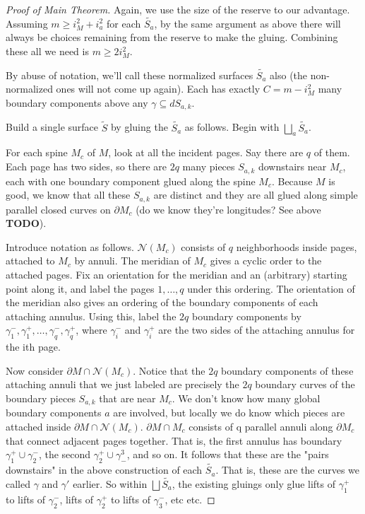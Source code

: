 \documentclass[12pt]{amsart}
\theoremstyle{definition}
\theoremstyle{remark}
\newcommand{\bd}{\partial}
\newcommand{\cin}{\subseteq}
\newcommand{\cN}{\mathcal{N}}
\begin{document}
\begin{proof}[Proof of Main Theorem]
Again, we use the size of the reserve to our advantage. Assuming $m\geq i_M^2
+ i_a^2$ for each $\widetilde{S_a}$, by the same argument as above there will
always be choices remaining from the reserve to make the gluing. Combining
these all we need is $m\geq 2i_M^2$.

By abuse of notation, we'll call these normalized surfaces $\widetilde{S_a}$ also (the
non-normalized ones will not come up again). Each has exactly $C = m - i_M^2$
many boundary components above any $\gamma \cin dS_{a,k}$.

Build a single surface $\widetilde{S}$ by gluing the $\widetilde{S_a}$ as follows. Begin with
$\bigsqcup_a \widetilde{S_a}$.

For each spine $M_c$ of $M$, look at all the incident pages. Say there are $q$
of them.  Each page has two sides, so there are $2q$ many pieces $S_{a,k}$
downstairs near $M_c$, each with one boundary component glued along the spine
$M_c$.  Because $M$ is good, we know that all these $S_{a,k}$ are distinct and
they are all glued along simple parallel closed curves on $\bd M_c$ (do we know
they're longitudes?  See above \textbf{ TODO}).

Introduce notation as follows. $\cN(M_c)$ consists of $q$ neighborhoods inside
pages, attached to $M_c$ by annuli. The meridian of $M_c$ gives a cyclic order to
the attached pages.  Fix an orientation for the meridian and an (arbitrary)
starting point along it, and label the pages $1, \dots, q$ under this ordering.
The orientation of the meridian also gives an ordering of the boundary
components of each attaching annulus.  Using this, label the $2q$ boundary
components by $\gamma_1^-,\gamma_1^+,\dots, \gamma_q^-,\gamma_q^+$, where
$\gamma_i^-$ and $\gamma_i^+$ are the two sides of the attaching annulus for
the ith page.

Now consider $\bd M \cap \cN(M_c)$. Notice that the $2q$ boundary components of these
attaching annuli that we just labeled are precisely the $2q$ boundary curves of
the boundary pieces $S_{a,k}$ that are near $M_c$. We don't know how many global
boundary components $a$ are involved, but locally we do know which pieces are
attached inside $\bd M \cap \cN(M_c)$. $\bd M \cap M_c$ consists of q parallel annuli
along $\bd M_c$ that connect adjacent pages together. That is, the first annulus
has boundary $\gamma_1^+ \cup \gamma_2^-$, the second $\gamma_2^+ \cup
\gamma^3_-$, and so on.  It follows that these are the "pairs downstairs" in
the above construction of each $\widetilde{S_a}$. That is, these are the curves
we called $\gamma$ and $\gamma'$ earlier.  So within $\bigsqcup \widetilde{S_a}$,
the existing gluings only glue lifts of $\gamma_1^+$ to lifts of $\gamma_2^-$,
lifts of $\gamma_2^+$ to lifts of $\gamma_3^-$, etc etc.


\end{proof}
\end{document}
